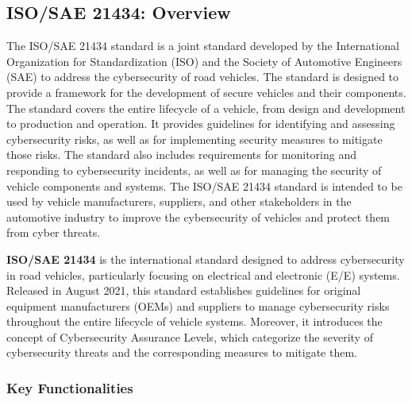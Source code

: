 \subsection{ISO/SAE 21434: Overview}\label{subsec:iso-sae-21434}

The ISO/SAE 21434 standard is a joint standard developed by the International Organization for Standardization (ISO) and the Society of Automotive Engineers (SAE) to address the cybersecurity of road vehicles.
The standard is designed to provide a framework for the development of secure vehicles and their components.
The standard covers the entire lifecycle of a vehicle, from design and development to production and operation.
It provides guidelines for identifying and assessing cybersecurity risks, as well as for implementing security measures to mitigate those risks.
The standard also includes requirements for monitoring and responding to cybersecurity incidents, as well as for managing the security of vehicle components and systems.
The ISO/SAE 21434 standard is intended to be used by vehicle manufacturers,
suppliers, and other stakeholders in the automotive industry to improve the cybersecurity of vehicles and protect them from cyber threats\cite{iso-correlation}.

\textbf{ISO/SAE 21434} is the international standard designed to address cybersecurity in road vehicles, particularly focusing on electrical and electronic (E/E) systems.
Released in August 2021, this standard establishes guidelines for original equipment manufacturers (OEMs) and suppliers to manage cybersecurity risks throughout the entire lifecycle of vehicle systems.
Moreover, it introduces the concept of Cybersecurity Assurance Levels, which categorize the severity of cybersecurity threats and the corresponding measures to mitigate them\cite{moukahal2021towards}.
\subsubsection{Key Functionalities}\label{subsubsec:key-functionalities}

